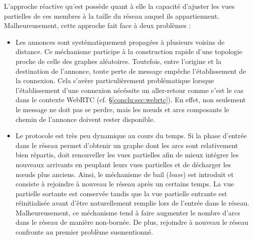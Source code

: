 L'approche réactive qu'est \SCAMP possède quant à elle la capacité d'ajuster les
vues partielles de ces membres à la taille du réseau auquel ils
appartiennent. Malheureusement, cette approche fait face à deux problèmes :
\begin{itemize}
\item Les annonces sont systématiquement propagées à plusieurs voisins de
  distance. Ce méchanisme participe à la construction rapide d'une topologie
  proche de celle des graphes aléatoires. Toutefois, entre l'origine et la
  destination de l'annonce, toute perte de message empêche l'établissement de la
  connexion. Cela s'avère particulièrement problématique lorsque l'établissement
  d'une connexion nécéssite un aller-retour comme c'est le cas dans le contexte
  WebRTC (cf. §\ref{conclu:sec:webrtc}). En effet, non seulement le message ne
  doit pas se perdre, mais les nœuds et arcs composants le chemin de l'annonce
  doivent rester disponible.
\item Le protocole est très peu dynamique au cours du temps. Si la phase
  d'entrée dans le réseau permet d'obtenir un graphe dont les arcs sont
  relativement bien répartis, \SCAMP doit renouveller les vues partielles afin
  de mieux intégrer les nouveaux arrivants en peuplant leurs vues partielles et
  de décharger les nœuds plus anciens. Ainsi, le méchanisme de bail
  (\emph{lease}) est introduit et consiste à rejoindre à nouveau le réseau après
  un certains temps. La vue partielle sortante est conservée tandis que la vue
  partielle entrante est réinitialisée avant d'être naturellement remplie lors
  de l'entrée dans le réseau. Malheureusement, ce méchanisme tend à faire
  augmenter le nombre d'arcs dans le réseau de manière non-bornée. De plus,
  rejoindre à nouveau le réseau confronte au premier problème susmentionné.
\end{itemize}



